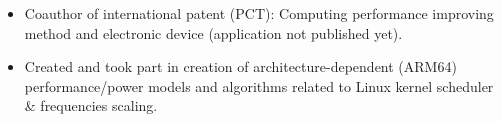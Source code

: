 
    \begin{itemize}
        \item Coauthor of international patent (PCT): Computing performance improving method and
            electronic device (application not published yet).
        \smallskip
        \item Created and took part in creation of architecture-dependent (ARM64) performance/power
            models and algorithms related to Linux kernel scheduler \& frequencies scaling.
    \end{itemize}


    \smallskip

